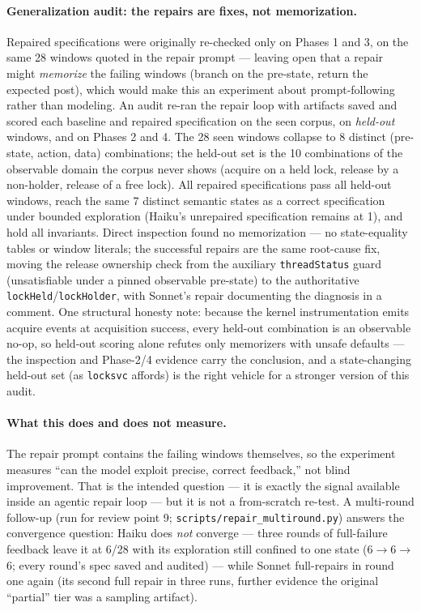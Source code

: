 \documentclass[11pt]{article}
\begin{document}
\paragraph{Generalization audit: the repairs are fixes, not memorization.}
Repaired specifications were originally re-checked only on Phases 1 and 3,
on the same 28 windows quoted in the repair prompt --- leaving open that a
repair might \emph{memorize} the failing windows (branch on the pre-state,
return the expected post), which would make this an experiment about
prompt-following rather than modeling. An audit re-ran the repair loop with
artifacts saved and scored each baseline and repaired specification on the
seen corpus, on \emph{held-out} windows, and on Phases 2 and 4. The 28 seen
windows collapse to 8 distinct (pre-state, action, data) combinations; the
held-out set is the 10 combinations of the observable domain the corpus
never shows (acquire on a held lock, release by a non-holder, release of a
free lock). All repaired specifications pass all held-out windows, reach
the same 7 distinct semantic states as a correct specification under
bounded exploration (Haiku's unrepaired specification remains at 1), and
hold all invariants. Direct inspection found no memorization --- no
state-equality tables or window literals; the successful repairs are the
same root-cause fix, moving the release ownership check from the auxiliary
\texttt{threadStatus} guard (unsatisfiable under a pinned observable
pre-state) to the authoritative \texttt{lockHeld}/\texttt{lockHolder},
with Sonnet's repair documenting the diagnosis in a comment. One
structural honesty note: because the kernel instrumentation emits acquire
events at acquisition success, every held-out combination is an observable
no-op, so held-out scoring alone refutes only memorizers with unsafe
defaults --- the inspection and Phase-2/4 evidence carry the conclusion,
and a state-changing held-out set (as \texttt{locksvc} affords) is the
right vehicle for a stronger version of this audit.

\paragraph{What this does and does not measure.}
The repair prompt contains the failing windows themselves, so the experiment
measures ``can the model exploit precise, correct feedback,'' not blind
improvement. That is the intended question --- it is exactly the signal
available inside an agentic repair loop --- but it is not a from-scratch
re-test. A multi-round follow-up (run for review point 9;
\texttt{scripts/repair\_multiround.py}) answers the convergence question:
Haiku does \emph{not} converge --- three rounds of full-failure feedback
leave it at 6/28 with its exploration still confined to one state
(6$\to$6$\to$6; every round's spec saved and audited) --- while Sonnet
full-repairs in round one again (its second full repair in three runs,
further evidence the original ``partial'' tier was a sampling artifact).
\end{document}
